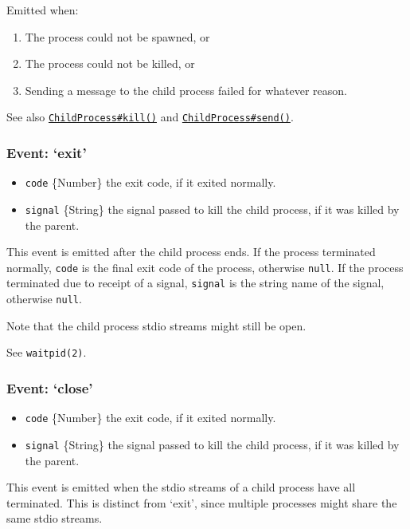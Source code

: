 Emitted when:

\begin{enumerate}[1.]
\item
  The process could not be spawned, or
\item
  The process could not be killed, or
\item
  Sending a message to the child process failed for whatever reason.
\end{enumerate}

See also
\hyperref[child\_process\_child\_kill\_signal]{\texttt{ChildProcess\#kill()}}
and
\hyperref[child\_process\_child\_send\_message\_sendhandle]{\texttt{ChildProcess\#send()}}.

\subsubsection{Event: `exit'}

\begin{itemize}
\item
  \texttt{code} \{Number\} the exit code, if it exited normally.
\item
  \texttt{signal} \{String\} the signal passed to kill the child
  process, if it was killed by the parent.
\end{itemize}

This event is emitted after the child process ends. If the process
terminated normally, \texttt{code} is the final exit code of the
process, otherwise \texttt{null}. If the process terminated due to
receipt of a signal, \texttt{signal} is the string name of the signal,
otherwise \texttt{null}.

Note that the child process stdio streams might still be open.

See \texttt{waitpid(2)}.

\subsubsection{Event: `close'}

\begin{itemize}
\item
  \texttt{code} \{Number\} the exit code, if it exited normally.
\item
  \texttt{signal} \{String\} the signal passed to kill the child
  process, if it was killed by the parent.
\end{itemize}

This event is emitted when the stdio streams of a child process have all
terminated. This is distinct from `exit', since multiple processes might
share the same stdio streams.

